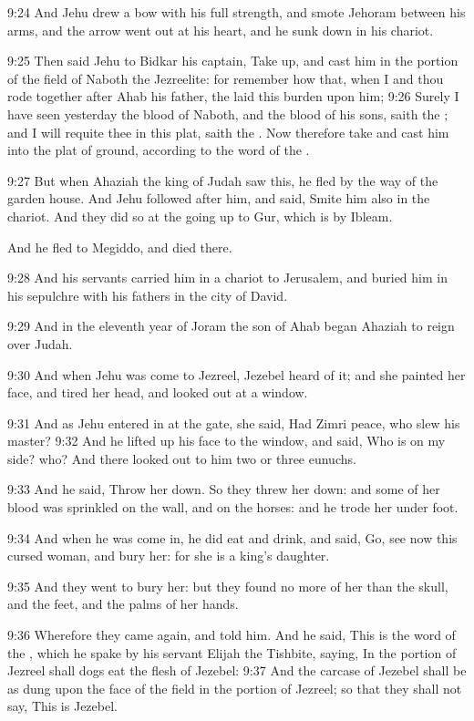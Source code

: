 9:24 And Jehu drew a bow with his full strength, and smote Jehoram between his arms, and the arrow went out at his heart, and he sunk down in his chariot.

9:25 Then said Jehu to Bidkar his captain, Take up, and cast him in the portion of the field of Naboth the Jezreelite: for remember how that, when I and thou rode together after Ahab his father, the \LORD laid this burden upon him; 9:26 Surely I have seen yesterday the blood of Naboth, and the blood of his sons, saith the \LORD; and I will requite thee in this plat, saith the \LORD. Now therefore take and cast him into the plat of ground, according to the word of the \LORD.

9:27 But when Ahaziah the king of Judah saw this, he fled by the way of the garden house. And Jehu followed after him, and said, Smite him also in the chariot. And they did so at the going up to Gur, which is by Ibleam.

And he fled to Megiddo, and died there.

9:28 And his servants carried him in a chariot to Jerusalem, and buried him in his sepulchre with his fathers in the city of David.

9:29 And in the eleventh year of Joram the son of Ahab began Ahaziah to reign over Judah.

9:30 And when Jehu was come to Jezreel, Jezebel heard of it; and she painted her face, and tired her head, and looked out at a window.

9:31 And as Jehu entered in at the gate, she said, Had Zimri peace, who slew his master?  9:32 And he lifted up his face to the window, and said, Who is on my side?  who? And there looked out to him two or three eunuchs.

9:33 And he said, Throw her down. So they threw her down: and some of her blood was sprinkled on the wall, and on the horses: and he trode her under foot.

9:34 And when he was come in, he did eat and drink, and said, Go, see now this cursed woman, and bury her: for she is a king's daughter.

9:35 And they went to bury her: but they found no more of her than the skull, and the feet, and the palms of her hands.

9:36 Wherefore they came again, and told him. And he said, This is the word of the \LORD, which he spake by his servant Elijah the Tishbite, saying, In the portion of Jezreel shall dogs eat the flesh of Jezebel: 9:37 And the carcase of Jezebel shall be as dung upon the face of the field in the portion of Jezreel; so that they shall not say, This is Jezebel.


